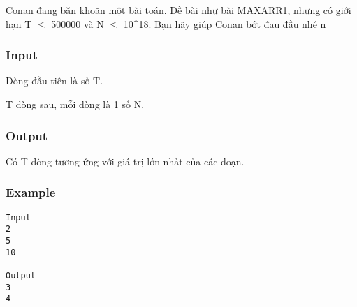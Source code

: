 



   Conan đang băn khoăn một bài toán. Đề bài như bài MAXARR1, nhưng có giới hạn T  $\le$  500000 và N  $\le$  10^18. Bạn hãy giúp Conan bớt đau đầu nhé ^^.  

\subsubsection{   Input  }

   Dòng đầu tiên là số T.  

   T dòng sau, mỗi dòng là 1 số N.  

\subsubsection{   Output  }

   Có T dòng tương ứng với giá trị lớn nhất của các đoạn.  

\subsubsection{   Example  }
\begin{verbatim}
Input
2
5
10

Output
3
4
\end{verbatim}
